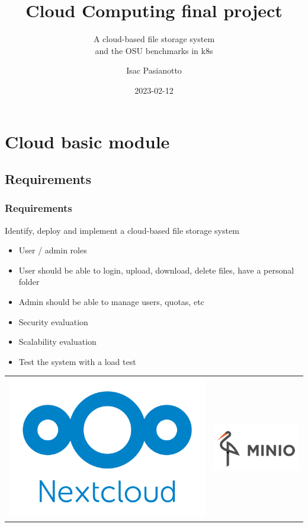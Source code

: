\documentclass{beamer}
\author{}
\subtitle{}
\title{\insertsection}
\date{}
\title[Cloud Computing final project]{\Huge{Cloud Computing final project}}
\subtitle{A cloud-based file storage system \\ and the OSU benchmarks in k8s}
\author{Isac Pasianotto}
\date{2023-02-12}
\begin{document}
\begin{frame}
    \titlepage
\end{frame}


\section{Cloud \textbf{basic} module}
\subsection{Requirements}

\begin{frame}
    \frametitle{Requirements}
    Identify, deploy and implement a cloud-based file storage system
    \begin{itemize}
        \item User / admin roles
        \item User should be able to login, upload, download, delete files, have a personal folder
        \item Admin should be able to manage users, quotas, etc
        \item Security evaluation
        \item Scalability evaluation
        \item Test the system with a load test
    \end{itemize}
    \begin{center}
        \begin{tabular}{cc}
            \includegraphics[height=0.2\textheight]{images/other/nextcloud-logo-extended} & \includegraphics[height=0.2\textheight]{images/other/minIO-logo}

\end{tabular}
\end{center}
\end{frame}
\end{document}
